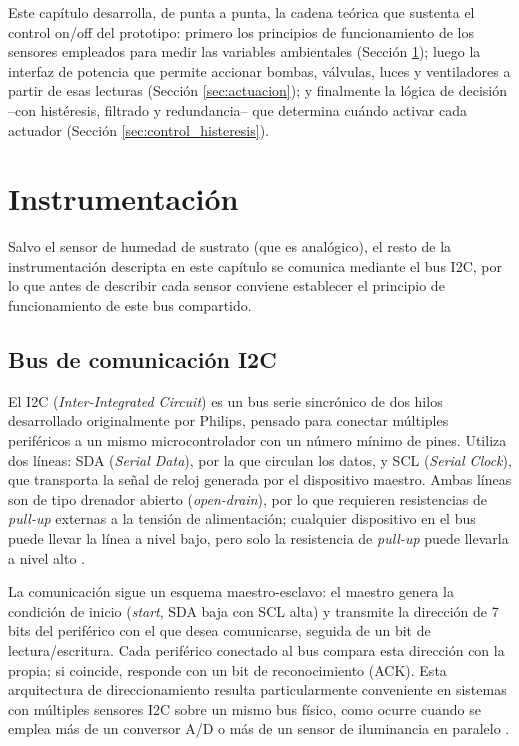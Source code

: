 Este capítulo desarrolla, de punta a punta, la cadena teórica que sustenta el control on/off del prototipo: primero los principios de funcionamiento de los sensores empleados para medir las variables ambientales (Sección \ref{sec:instrumentacion}); luego la interfaz de potencia que permite accionar bombas, válvulas, luces y ventiladores a partir de esas lecturas (Sección \ref{sec:actuacion}); y finalmente la lógica de decisión --con histéresis, filtrado y redundancia-- que determina cuándo activar cada actuador (Sección \ref{sec:control_histeresis}).

\section{Instrumentación}
\label{sec:instrumentacion}

Salvo el sensor de humedad de sustrato (que es analógico), el resto de la instrumentación descripta en este capítulo se comunica mediante el bus I2C, por lo que antes de describir cada sensor conviene establecer el principio de funcionamiento de este bus compartido.

\subsection{Bus de comunicación I2C}
\label{subsec:i2c}

El I2C (\textit{Inter-Integrated Circuit}) es un bus serie sincrónico de dos hilos desarrollado originalmente por Philips, pensado para conectar múltiples periféricos a un mismo microcontrolador con un número mínimo de pines. Utiliza dos líneas: SDA (\textit{Serial Data}), por la que circulan los datos, y SCL (\textit{Serial Clock}), que transporta la señal de reloj generada por el dispositivo maestro. Ambas líneas son de tipo drenador abierto (\textit{open-drain}), por lo que requieren resistencias de \textit{pull-up} externas a la tensión de alimentación; cualquier dispositivo en el bus puede llevar la línea a nivel bajo, pero solo la resistencia de \textit{pull-up} puede llevarla a nivel alto \cite{i2c_ardumania}.

La comunicación sigue un esquema maestro-esclavo: el maestro genera la condición de inicio (\textit{start}, SDA baja con SCL alta) y transmite la dirección de 7 bits del periférico con el que desea comunicarse, seguida de un bit de lectura/escritura. Cada periférico conectado al bus compara esta dirección con la propia; si coincide, responde con un bit de reconocimiento (ACK). Esta arquitectura de direccionamiento resulta particularmente conveniente en sistemas con múltiples sensores I2C sobre un mismo bus físico, como ocurre cuando se emplea más de un conversor A/D o más de un sensor de iluminancia en paralelo \cite{i2c_ardumania}.

